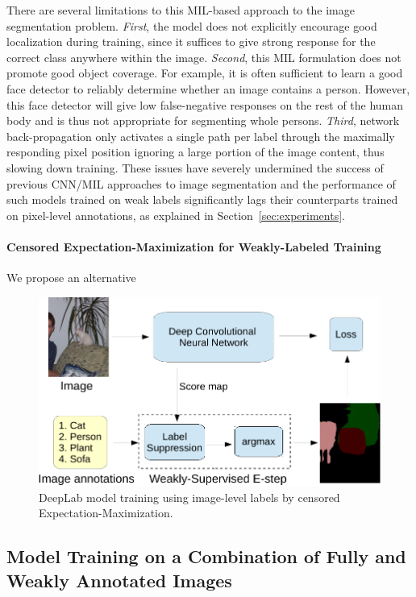 There are several limitations to this MIL-based approach to the image
segmentation problem. \emph{First}, the model does not explicitly
encourage good localization during training, since it suffices to give
strong response for the correct class anywhere within the
image. \emph{Second}, this MIL formulation does not promote good
object coverage. For example, it is often sufficient to learn a good
face detector to reliably determine whether an image contains a
person. However, this face detector will give low false-negative
responses on the rest of the human body and is thus not appropriate
for segmenting whole persons. \emph{Third}, network back-propagation
only activates a single path per label through the maximally
responding pixel position ignoring a large portion of the image
content, thus slowing down training. These issues have severely
undermined the success of previous CNN/MIL approaches to image
segmentation and the performance of such models trained on weak labels
significantly lags their counterparts trained on pixel-level
annotations, as explained in Section~\ref{sec:experiments}.

\paragraph{Censored Expectation-Maximization for Weakly-Labeled Training}

We propose an alternative 

\begin{figure}[htbp!]
  \centering
  \includegraphics[width=0.9\linewidth]{fig/model_train_image.pdf} 
  \caption{DeepLab model training using image-level labels by
    censored Expectation-Maximization.}
  \label{fig:model_train_image}
\end{figure}

\subsection{Model Training on a Combination of Fully and Weakly Annotated Images}

